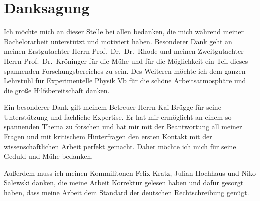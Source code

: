 \chapter*{Danksagung}
Ich möchte mich an dieser Stelle bei allen bedanken, die mich während meiner Bachelorarbeit unterstützt und motiviert haben.
Besonderer Dank geht an meinen Erstgutachter Herrn Prof.~Dr.~Dr.~Rhode und meinen Zweitgutachter Herrn Prof.~Dr.~Kröninger für die Mühe
und für die Möglichkeit ein Teil dieses spannenden Forschungsbereiches zu sein. Des Weiteren möchte ich dem ganzen Lehrstuhl für
Experimentelle Physik Vb für die schöne Arbeitsatmosphäre und die große Hilfsbereitschaft danken.

Ein besonderer Dank gilt meinem Betreuer Herrn Kai Brügge für seine Unterstützung und fachliche Expertise. Er hat mir ermöglicht
an einem so spannenden Thema zu forschen und hat mir mit der Beantwortung all meiner Fragen und mit kritischem Hinterfragen den
ersten Kontakt mit der wissenschaftlichen Arbeit perfekt gemacht. Daher möchte ich mich für seine Geduld und Mühe bedanken.

Außerdem muss ich meinen Kommilitonen Felix Kratz, Julian Hochhaus und Niko Salewski danken, die meine Arbeit Korrektur gelesen haben und dafür gesorgt
haben, dass meine Arbeit dem Standard der deutschen Rechtschreibung genügt.

